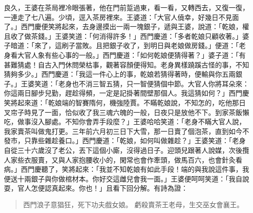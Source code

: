 良久，王婆在茶局裡冷眼張著，他在門前踅過東，看一看，又轉西去，又復一復，一連走了七八遍。少頃，逕入茶房裡來。王婆道：「大官人僥幸，好幾日不見面了。」西門慶便笑將起來，去身邊摸出一兩一塊銀子，遞與王婆，說道：「乾娘，權且收了做茶錢。」王婆笑道：「何消得許多！」西門慶道：「多者乾娘只顧收著。」婆子暗道：「來了，這刷子當敗。且把銀子收了，到明日與老娘做房錢。」便道：「老身看大官人象有些心事的一般。」西門慶道：「如何乾娘便猜得著？」婆子道：「有甚難猜處！自古入門休問榮枯事，觀著容顏便得知。老身異樣蹺蹊古怪的事，不知猜夠多少。」西門慶道：「我這一件心上的事，乾娘若猜得著時，便輸與你五兩銀子。」王婆笑道：「老身也不消三智五猜，只一智便猜個中節。大官人你將耳朵來：你這兩日腳步兒勤，趕趁得頻，一定是記掛著間壁那個人。我這猜如何？」西門慶笑將起來道：「乾娘端的智賽隋何，機強陸賈。不瞞乾娘說，不知怎的，吃他那日叉帘子時見了一面，恰似收了我三魂六魄的一般，日夜只是放他不下。到家茶飯懶吃，做事沒入腳處。不知你會弄手段麼？」王婆哈哈笑道：「老身不瞞大官人說，我家賣茶叫做鬼打更。三年前六月初三日下大雪，那一日賣了個泡茶，直到如今不發市，只靠些雜趁養口。」西門慶道：「乾娘，如何叫做雜趁？」王婆笑道：「老身自從三十六歲沒了老公，丟下這個小廝，沒得過日子。迎頭兒跟著人說媒，次後攬人家些衣服賣，又與人家抱腰收小的，閑常也會作牽頭，做馬百六，也會針灸看病。」西門慶聽了，笑將起來：「我並不知乾娘有如此手段！端的與我說這件事，我便送十兩銀子與你做棺材本。你好交這雌兒會我一面。」王婆便呵呵笑道：「我自說耍，官人怎便認真起來。你也！」且看下回分解。有詩為證：
\begin{quote}
西門浪子意猖狂，死下功夫戲女娘。
虧殺賣茶王老母，生交巫女會襄王。
\end{quote}

